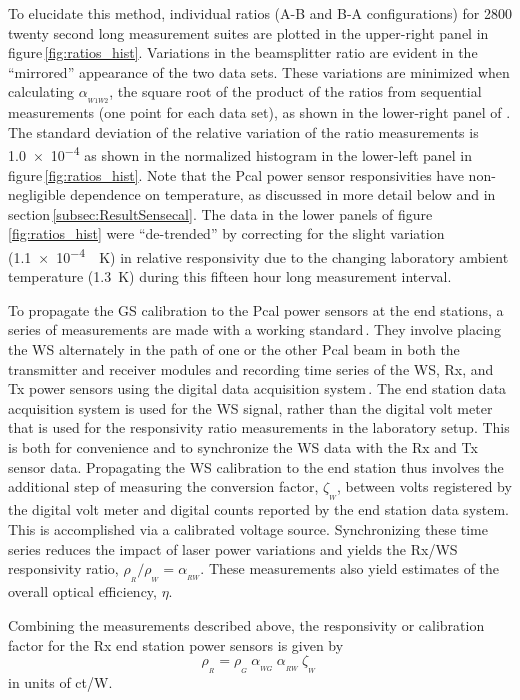 \documentclass[12pt,a4paper,final]{iopart}
\begin{document}
To elucidate this method, individual ratios (A-B and B-A configurations) for 2800 twenty second long measurement suites are plotted in the upper-right panel in figure\,\ref{fig:ratios_hist}.  Variations in the beamsplitter ratio are evident in the ``mirrored'' appearance of the two data sets.  These variations are minimized when calculating $\alpha_{_{W1W2}}$,  the square root of the product of the ratios from sequential measurements (one point for each data set), as shown in the lower-right panel of .  The standard deviation of the relative variation of the ratio measurements is \num{1.0e-4} as shown in the normalized histogram in the lower-left panel in figure\,\ref{fig:ratios_hist}.  Note that the Pcal power sensor responsivities have non-negligible dependence on temperature, as discussed in more detail below  and in section\,\ref{subsec:ResultSensecal}.   The data in the lower panels of figure\,\ref{fig:ratios_hist} were ``de-trended'' by correcting for the   slight variation (\SI{1.1e-4}{\per K}) in relative responsivity due to the changing laboratory ambient temperature (\SI{1.3}{K}) during this fifteen hour long measurement interval. 

To propagate the GS calibration to the Pcal power sensors at the end stations, a series of measurements are made with a working standard\,\cite{end_station_index}. They involve placing the WS alternately in the path of one or the other Pcal beam in both the transmitter and receiver modules and recording time series of the WS, Rx, and Tx power sensors using the digital data acquisition system\,\cite{P2000107}.  The end station data acquisition system is used for the WS signal, rather than the digital volt meter that is used for the responsivity ratio measurements in the laboratory setup.  This is both for convenience and to synchronize the WS data with the Rx and Tx sensor data.  Propagating the WS calibration to the end station thus involves the additional step of measuring the conversion factor, $\zeta_{_{W}}$, between volts registered by the digital volt meter and digital counts reported by the end station data system.  This is accomplished via a calibrated voltage source.
Synchronizing these time series reduces the impact of laser power variations and yields the Rx/WS responsivity ratio, $\rho_{_{R}}/\rho_{_{W}}=\alpha_{_{RW}}$.
These measurements also yield estimates of the overall optical efficiency, $\eta$.

Combining the measurements described above, the responsivity or calibration factor for the Rx end station power sensors is given by%
%
\begin{equation}
\label{eq:rho_TR}
    \rho_{_{R}} = \rho_{_{G}} \ \alpha_{_{WG}} \  \alpha_{_{RW}} \ \zeta_{_{W}} \,
\end{equation}
%
in units of ct/W.
\end{document}
